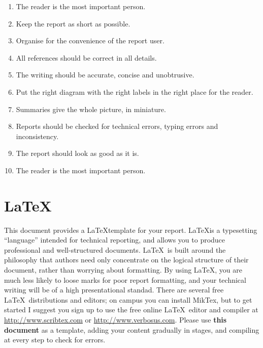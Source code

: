 \documentclass[12pt, a4paper]{report}
\begin{document}
\begin{snugshade}
\begin{enumerate} \itemsep -5pt
    \item The reader is the most important person.
    \item Keep the report as short as possible. 
    \item Organise for the convenience of the report user.
    \item All references should be correct in all details. 
    \item The writing should be accurate, concise and unobtrusive. 
    \item Put the right diagram with the right labels in the right place for the reader. 
    \item Summaries give the whole picture, in miniature. 
    \item Reports should be checked for technical errors, typing errors and inconsistency.
    \item The report should look as good as it is. 
    \item The reader is the most important person.
\end{enumerate}
\end{snugshade}

\section{\LaTeX}

This document provides a \LaTeX template for your report. \LaTeX is a typesetting ``language'' intended for technical reporting, and allows you to produce professional and well-structured documents. \LaTeX~is built around the philosophy that authors need only concentrate on the logical structure of their document, rather than worrying about formatting. By using \LaTeX, you are much less likely to loose marks for poor report formatting, and your technical writing will be of a high presentational standad. There are several free \LaTeX~distributions and editors; on campus you can install MikTex, but to get started I suggest you sign up to use the free online \LaTeX~editor and compiler at \url{http://www.scribtex.com} or \url{http://www.verbosus.com}. Please use \textbf{this document} as a template, adding your content gradually in stages, and compiling at every step to check for errors. 
\end{document}
